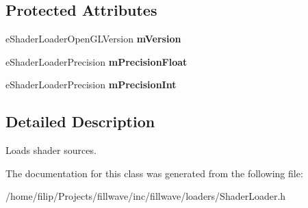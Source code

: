 \subsection*{Protected Attributes}
\begin{DoxyCompactItemize}
\item 
\hypertarget{classfillwave_1_1loader_1_1ShaderLoader_a76abc99ac6579c92d5f187ea2a0cbdbb}{}e\+Shader\+Loader\+Open\+G\+L\+Version {\bfseries m\+Version}\label{classfillwave_1_1loader_1_1ShaderLoader_a76abc99ac6579c92d5f187ea2a0cbdbb}

\item 
\hypertarget{classfillwave_1_1loader_1_1ShaderLoader_afdfe1a552c9418fb092ce6e6a4cfd45d}{}e\+Shader\+Loader\+Precision {\bfseries m\+Precision\+Float}\label{classfillwave_1_1loader_1_1ShaderLoader_afdfe1a552c9418fb092ce6e6a4cfd45d}

\item 
\hypertarget{classfillwave_1_1loader_1_1ShaderLoader_a103d785ec08714b78a934b8adaa37188}{}e\+Shader\+Loader\+Precision {\bfseries m\+Precision\+Int}\label{classfillwave_1_1loader_1_1ShaderLoader_a103d785ec08714b78a934b8adaa37188}

\end{DoxyCompactItemize}


\subsection{Detailed Description}
Loads shader sources. 

The documentation for this class was generated from the following file\+:\begin{DoxyCompactItemize}
\item 
/home/filip/\+Projects/fillwave/inc/fillwave/loaders/Shader\+Loader.\+h\end{DoxyCompactItemize}
